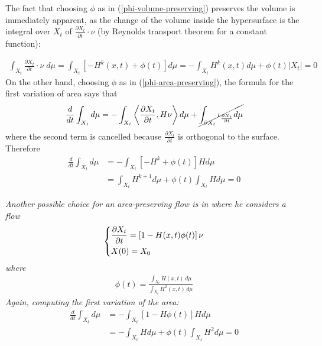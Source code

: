 The fact that choosing $\phi$ as in (\ref{phi-volume-preserving}) preserves the volume is immediately apparent, as the change of the volume inside the hypersurface is the integral over $X_t$ of $\frac{\partial X_t}{\partial t}\cdot \nu$ (by Reynolds transport theorem for a constant function): 

\begin{align*}
		\int_{X_t}\frac{\partial X_t}{\partial t}\cdot \nu \;d\mu= \int_{X_t} \left[- H^k(x, t) + \phi(t)\right] d\mu = - \int_{X_t}  H^k(x, t) d\mu + \phi(t)|X_t|=0
\end{align*}
On the other hand, choosing $\phi$ as in (\ref{phi-area-preserving}), the formula for the first variation of area says that 
\begin{align*}
	\frac{d}{d t}\int_{X_t} d\mu = -  \int_{X_t} \left\langle\frac{\partial X_t}{\partial t} , H \nu \right\rangle d\mu  +\cancel{\int_{\partial X_t}\iota_{\frac{\partial X_t}{\partial t}}  d\mu}
\end{align*}
where the second term is cancelled because $\frac{\partial X_t}{\partial t}$ is orthogonal to the surface. Therefore
\begin{align*}
	\frac{d}{d t}\int_{X_t} d\mu &= -  \int_{X_t}  \left[- H^k + \phi(t)\right] H d\mu \\
	&=  \int_{X_t}  H^{k+1} d\mu  + \phi(t)\int_{X_t} H d\mu = 0
\end{align*}

\begin{oss}\em
Another possible choice for an area-preserving flow is in \cite{mccoy} where he considers a flow 
\begin{align}
	\begin{dcases}
		\frac{\partial X_t}{\partial t} = \left[1 - H(x, t)  \phi(t)\right] \nu\\
		X(0)= X_0
	\end{dcases} \label{mccoy equation}
\end{align}
where 
\begin{align*}
	\phi(t) = \frac{\int_{X_t} H(x, t) \, d\mu}{\int_{X_t} H^{2}(x, t) \, d\mu}
\end{align*}
Again, computing the first variation of the area:
\begin{align*}
	\frac{d}{d t}\int_{X_t} d\mu &= -  \int_{X_t}  \left[1 - H\phi(t)\right] H d\mu \\
	&= - \int_{X_t}  H d\mu  + \phi(t)\int_{X_t} H^{2} d\mu = 0
\end{align*}
\end{oss}
